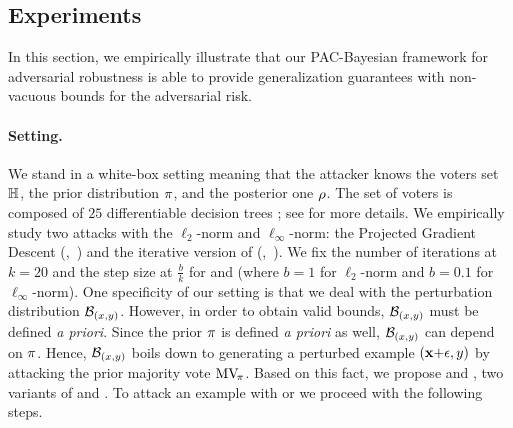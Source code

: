 \subsection{Experiments}
\label{chap:mv-robustness:sec:expe-desc}

In this section, we empirically illustrate that our PAC-Bayesian framework for adversarial robustness is able to provide generalization guarantees with non-vacuous bounds for the adversarial risk.

\paragraph{Setting.}
We stand in a white-box setting meaning that the attacker knows the voters set $\H$, the prior distribution $\P$, and the posterior one $\Q$.
The set of voters is composed of $25$ differentiable decision trees \citep{KontschiederFiterauCriminisiBulo2016}; see  for more details.
We empirically study two attacks with the \mbox{$\ell_{2}$-norm} and \mbox{$\ell_{\infty}$-norm}: the Projected Gradient Descent (\PGD,~\citet{MadryMakelovSchmidtTsiprasVladu2018}) and the iterative version of \FGSM (\IFGSM,~\citet{KurakinGoodfellowBengio2017}).
We fix the number of iterations at $k{=}20$ and the step size at $\frac{b}{k}$ for \PGD and \IFGSM (where $b{=}1$ for $\ell_2$-norm and $b{=}0.1$ for $\ell_\infty$-norm).
One specificity of our setting is that we deal with the perturbation distribution $\DX$.
However, in order to obtain valid bounds, $\DX$ must be defined {\it a priori}.
Since the prior $\P$ is defined {\it a priori} as well, $\DX$ can depend on $\P$.
Hence, $\DX$ boils down to generating a perturbed example $(\x{+}\epsilon, \y)$ by attacking the prior majority vote $\MVP$.
Based on this fact, we propose \PGDU and \IFGSMU, two variants of \PGD and \IFGSM.
To attack an example with \PGDU or \IFGSMU we proceed with the following steps.

